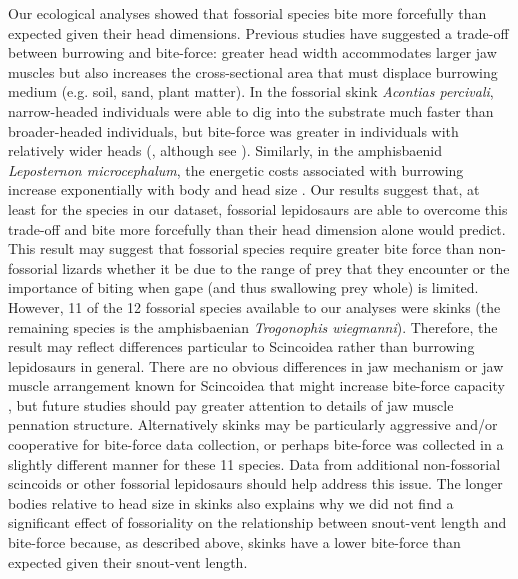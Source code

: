 \documentclass[a4paper, 12pt]{article}
\begin{document}
Our ecological analyses showed that fossorial species bite more forcefully than expected given their head dimensions.
Previous studies have suggested a trade-off between burrowing and bite-force: greater head width accommodates larger jaw muscles but also increases the cross-sectional area that must displace burrowing medium (e.g. soil, sand, plant matter). 
In the fossorial skink \textit{Acontias percivali}, narrow-headed individuals were able to dig into the substrate much faster than broader-headed individuals, but bite-force was greater in individuals with relatively wider heads (\citet{vanhooydonck2011push}, although see \citet{le2020trade}).
Similarly, in the amphisbaenid \textit{Leposternon microcephalum}, the energetic costs associated with burrowing increase exponentially with body and head size \citep{navas2004morphological}.
Our results suggest that, at least for the species in our dataset, fossorial lepidosaurs are able to overcome this trade-off and bite more forcefully than their head dimension alone would predict. 
This result may suggest that fossorial species require greater bite force than non-fossorial lizards whether it be due to the range of prey that they encounter or the importance of biting when gape (and thus swallowing prey whole) is limited. 
However, 11 of the 12 fossorial species available to our analyses were skinks (the remaining species is the amphisbaenian \textit{Trogonophis wiegmanni}).
Therefore, the result may reflect differences particular to Scincoidea rather than burrowing lepidosaurs in general.
There are no obvious differences in jaw mechanism or jaw muscle arrangement known for Scincoidea that might increase bite-force capacity \citep[e.g.][]{haas1973muscles,daza2011jaw}, but future studies should pay greater attention to details of jaw muscle pennation structure. 
Alternatively skinks may be particularly aggressive and/or cooperative for bite-force data collection, or perhaps bite-force was collected in a slightly different manner for these 11 species. 
Data from additional non-fossorial scincoids or other fossorial lepidosaurs should help address this issue.
The longer bodies relative to head size in skinks also explains why we did not find a significant effect of fossoriality on the relationship between snout-vent length and bite-force because, as described above, skinks have a lower bite-force than expected given their snout-vent length. 
\end{document}

